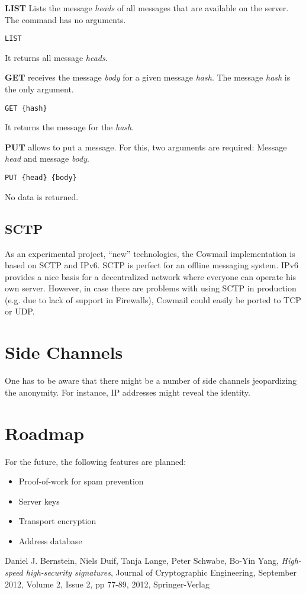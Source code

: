 \documentclass[a4paper]{article}
\begin{document}
\textbf{LIST} Lists the message \textit{heads} of all messages that are
available on the server. The command has no arguments.
\begin{verbatim}
LIST
\end{verbatim}
It returns all message \textit{heads}.

\textbf{GET} receives the message \textit{body} for a given message
\textit{hash}. The message \textit{hash} is the only argument.
\begin{verbatim}
GET {hash}
\end{verbatim}
It returns the message for the \textit{hash}.

\textbf{PUT} allows to put a message. For this, two arguments are required:
Message \textit{head} and message \textit{body}.
\begin{verbatim}
PUT {head} {body}
\end{verbatim}
No data is returned.

\subsection{SCTP}
As an experimental project, “new” technologies, the Cowmail implementation is
based on SCTP and IPv6. SCTP is perfect for an offline messaging system. IPv6
provides a nice basis for a decentralized network where everyone can operate
his own server. However, in case there are problems with using SCTP in
production (e.g. due to lack of support in Firewalls), Cowmail could easily be
ported to TCP or UDP.

\section{Side Channels}
One has to be aware that there might be a number of side channels jeopardizing
the anonymity. For instance, IP addresses might reveal the identity.

\section{Roadmap}
For the future, the following features are planned:
\begin{itemize}
\item Proof-of-work for spam prevention
\item Server keys
\item Transport encryption
\item Address database
\end{itemize}

\begin{thebibliography}{ABCDE99}

Daniel J. Bernstein, Niels Duif, Tanja Lange, Peter Schwabe, Bo-Yin Yang, 
\textit{High-speed high-security signatures}, 
Journal of Cryptographic Engineering,
September 2012, Volume 2, Issue 2, pp 77-89,
2012, Springer-Verlag

\end{thebibliography}
\end{document}
